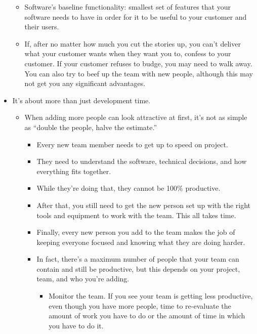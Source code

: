 \documentclass[letterpaper]{article}
\begin{document}
\begin{itemize}
\begin{itemize}
        \item Software's baseline functionality: smallest set of features that your software needs to have in order for it to be useful to your customer and their users. 
        \item If, after no matter how much you cut the stories up, you can't deliver what your customer wants when they want you to, confess to your customer. If your customer refuses to budge, you may need to walk away. You can also try to beef up the team with new people, although this may not get you any significant advantages.
    \end{itemize}

    \item It's about more than just development time. 
    \begin{itemize}
        \item When adding more people can look attractive at first, it's not as simple as ``double the people, halve the estimate.''
        \begin{itemize}
            \item Every new team member needs to get up to speed on project. 
            \item They need to understand the software, technical decisions, and how everything fits together. 
            \item While they're doing that, they cannot be 100\% productive. 
            \item After  that, you still need to get the new person set up with the right tools and equipment to work with the team. This all takes time. 
            \item Finally, every new person you add to the team makes the job of keeping everyone focused and knowing what they are doing harder. 
            \item In fact, there's a maximum number of people that your team can contain and still be productive, but this depends on your project, team, and who you're adding. 
            \begin{itemize}
                \item Monitor the team. If you see your team is getting less productive, even though you have more people, time to re-evaluate the amount of work you have to do or the amount of time in which you have to do it. 
            \end{itemize}
        \end{itemize}
    \end{itemize}


\end{itemize}
\end{document}
